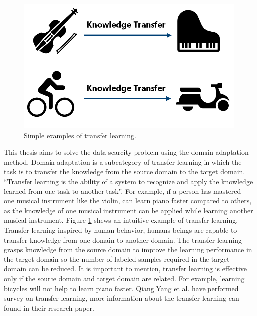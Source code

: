 \begin{figure}[H]
        \begin{center}
 	    \includegraphics[scale=0.40]{images/Introduction/TransferLearning.png}
	    \caption[Simple examples of transfer learning.]{Simple examples of transfer learning.}
	    \label{fig:TransferLearning}
	    \end{center}
\end{figure}

This thesis aims to solve the data scarcity problem using the domain adaptation method. Domain adaptation is a subcategory of transfer learning in which the task is to transfer the knowledge from the source domain to the target domain. ``Transfer learning is the ability of a system to recognize and apply the knowledge learned from one task to another task''\cite{zhuang2020comprehensive}. For example, if a person has mastered one musical instrument like the violin, can learn piano faster compared to others, as the knowledge of one musical instrument can be applied while learning another musical instrument. Figure \ref{fig:TransferLearning} shows an intuitive example of transfer learning. Transfer learning inspired by human behavior, humans beings are capable to transfer knowledge from one domain to another domain. The transfer learning grasps knowledge from the source domain to improve the learning performance in the target domain so the number of labeled samples required in the target domain can be reduced. It is important to mention, transfer learning is effective only if the source domain and target domain are related. For example, learning bicycles will not help to learn piano faster. Qiang Yang et al.\cite{5288526} have performed survey on transfer learning, more information about the transfer learning can found in their research paper.  

